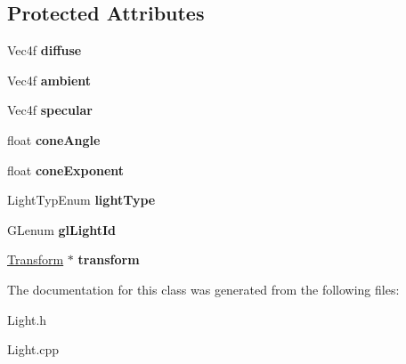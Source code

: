 \subsection*{Protected Attributes}
\begin{DoxyCompactItemize}
\item 
\hypertarget{class_light_a1b68d4ff673ffffd8c6bb24995ccde1e}{
Vec4f {\bfseries diffuse}}
\label{class_light_a1b68d4ff673ffffd8c6bb24995ccde1e}

\item 
\hypertarget{class_light_afa8ce9cb262a986a0fee095c8420fe0a}{
Vec4f {\bfseries ambient}}
\label{class_light_afa8ce9cb262a986a0fee095c8420fe0a}

\item 
\hypertarget{class_light_a0e4f7cb1501e06372a016e9264db37c8}{
Vec4f {\bfseries specular}}
\label{class_light_a0e4f7cb1501e06372a016e9264db37c8}

\item 
\hypertarget{class_light_a5c02ae068c634bf7327e4b66b4ea8744}{
float {\bfseries coneAngle}}
\label{class_light_a5c02ae068c634bf7327e4b66b4ea8744}

\item 
\hypertarget{class_light_a0f24e5db8e0b914a745c0a0f5bbef1f6}{
float {\bfseries coneExponent}}
\label{class_light_a0f24e5db8e0b914a745c0a0f5bbef1f6}

\item 
\hypertarget{class_light_aa4da12007ef812f8c73b0c65b19ee501}{
LightTypEnum {\bfseries lightType}}
\label{class_light_aa4da12007ef812f8c73b0c65b19ee501}

\item 
\hypertarget{class_light_a2dd418642e49db9b22bd206c82a8f29a}{
GLenum {\bfseries glLightId}}
\label{class_light_a2dd418642e49db9b22bd206c82a8f29a}

\item 
\hypertarget{class_light_a23c44b0fcf2249ff53707d136a2cfdc4}{
\hyperlink{class_transform}{Transform} $\ast$ {\bfseries transform}}
\label{class_light_a23c44b0fcf2249ff53707d136a2cfdc4}

\end{DoxyCompactItemize}


The documentation for this class was generated from the following files:\begin{DoxyCompactItemize}
\item 
Light.h\item 
Light.cpp\end{DoxyCompactItemize}

